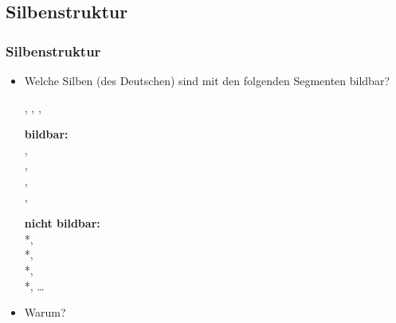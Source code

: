 \subsection{Silbenstruktur}
%
\begin{frame}
\frametitle{Silbenstruktur}

\begin{itemize}
	\item Welche Silben (des Deutschen) sind mit den folgenden Segmenten bildbar?

\ea \textipa{[p]}, \textipa{[a]}, \textipa{[l]}, \textipa{[t]}
\z

\pause	

\begin{multicols}{2}
\ea \textbf{bildbar:}\\
	\textipa{[palt]},\\
	\textipa{[alpt]}, \\
	\textipa{[lapt]}, \\
	\textipa{[talp]}, \\
	\textipa{[plat]}
\z 

\columnbreak

\pause

	\ea \textbf{nicht bildbar:}\\
	*\textipa{[ltap]}, \\
	*\textipa{[lpat]},\\
	*\textipa{[ptla]}, \\
	*\textipa{[tpal]}, 	\ldots 
\z
\end{multicols}

\pause

\item Warum?

\end{itemize}

\end{frame}



